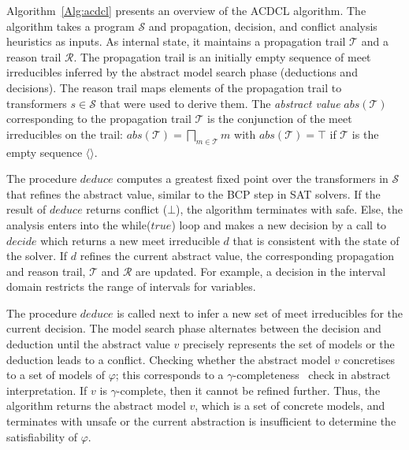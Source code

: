 Algorithm~\ref{Alg:acdcl} presents an overview of the ACDCL algorithm.
The algorithm takes a program 
$\mathcal{S}$ and propagation, decision, and conflict analysis
heuristics as inputs.  As internal state, it maintains a propagation
trail $\mathcal{T}$ and a reason trail  $\mathcal{R}$.
The propagation trail is an initially empty sequence of meet
irreducibles inferred by the abstract model search phase (deductions
and decisions). The reason trail maps  elements of the
propagation trail to transformers $s\in\mathcal{S}$ that were used to
derive them. The \emph{abstract value} $\mathit{abs}(\mathcal{T})$
corresponding to the propagation trail $\mathcal{T}$ is the
conjunction of the meet irreducibles on the trail:
$\mathit{abs}(\mathcal{T})=\bigsqcap_{m \in \mathcal{T}}m$ with
$\mathit{abs}(\mathcal{T})=\top$ if $\mathcal{T}$ is the empty
sequence $\langle\rangle$.

The procedure $deduce$ computes a greatest fixed point over the
transformers in $\mathcal{S}$ that refines the abstract value,
similar to the BCP step in SAT solvers.  If the result of $deduce$
returns \textsf{conflict} ($\bot$), the algorithm terminates with
\textsf{safe}.  Else, the analysis enters into the while($true$) loop
and makes a new decision by a call to $\mathit{decide}$ which returns
a new meet irreducible $d$ that is consistent with the state of the
solver.  If $d$
refines the current abstract value, the corresponding propagation
and reason trail, $\mathcal{T}$ and $\mathcal{R}$ are updated.
%
For example, a decision in the interval domain restricts the range of 
intervals for variables.

The procedure $deduce$ is called next to infer a new set of meet
irreducibles for the current decision.  The model search phase
alternates between the decision and deduction until the abstract value
$v$ precisely  represents the set of models or the
deduction leads to a \textsf{conflict}.  Checking whether the abstract
model $v$ concretises to a set of models of $\varphi$; this
corresponds to a $\gamma$-completeness~\cite{dhk2013-popl} check in
abstract interpretation.  If $v$ is $\gamma$-complete, then it cannot
be refined further.  Thus, the algorithm returns the abstract model
$v$, which is a set of concrete models, and terminates with
\textsf{unsafe} or the current abstraction is insufficient to
determine the satisfiability of $\varphi$.  


